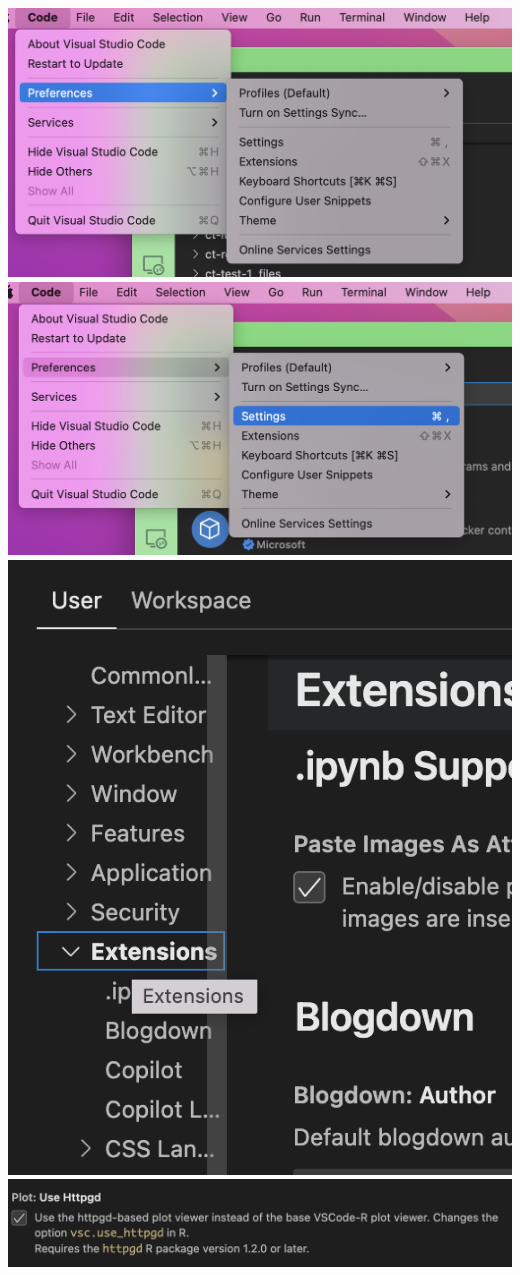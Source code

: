 \documentclass[
  letterpaper,
  DIV=11,
  numbers=noendperiod]{scrreprt}
\begin{document}
\includegraphics{images/plot-1.png} \includegraphics{images/plot-2.png}
\includegraphics{images/plot-3.png} \includegraphics{images/plot-4.png}
\end{document}
